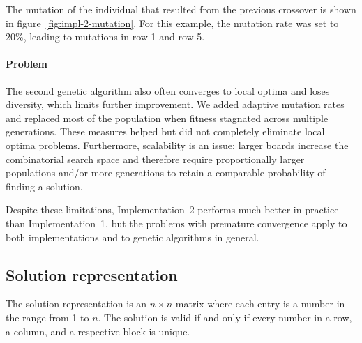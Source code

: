 The mutation of the individual that resulted from the previous crossover is shown in figure~\ref{fig:impl-2-mutation}. For this example, the mutation rate was set to 20\%, leading to mutations in row 1 and row 5. 

\paragraph{Problem}
The second genetic algorithm also often converges to local optima and loses diversity, which limits further improvement. We added adaptive mutation rates and replaced most of the population when fitness stagnated across multiple generations. These measures helped but did not completely eliminate local optima problems. Furthermore, scalability is an issue: larger boards increase the combinatorial search space and therefore require proportionally larger populations and/or more generations to retain a comparable probability of finding a solution. 

Despite these limitations, Implementation~2 performs much better in practice than Implementation~1, but the problems with premature convergence apply to both implementations and to genetic algorithms in general.

\subsection{Solution representation}
The solution representation is an $n \times n$ matrix where each entry is a number in the range from 1 to $n$. The solution is valid if and only if every number in a row, a column, and a respective block is unique.